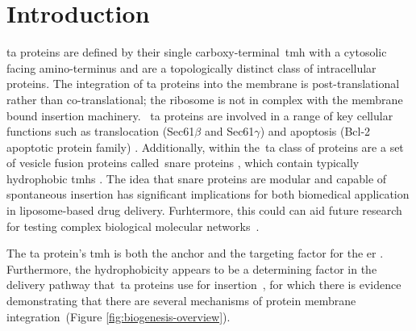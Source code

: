 \section{Introduction}

\gls{ta} proteins are defined by their single carboxy-terminal~\gls{tmh} with a cytosolic facing amino-terminus and are a topologically distinct class of intracellular proteins.
The integration of \gls{ta} proteins into the membrane is post\--translational rather than co-translational; the ribosome is not in complex with the membrane bound insertion machinery.
~\gls{ta} proteins are involved in a range of key cellular functions such as translocation \cite{Osborne2005} (Sec61$\beta$ and Sec61$\gamma$) and apoptosis (Bcl-2 apoptotic protein family) \cite{Hockenbery1990}.
Additionally, within the~\gls{ta} class of proteins are a set of vesicle fusion proteins called~\gls{snare} proteins \cite{Ungar2003}, which contain typically hydrophobic \gls{tmh}s \cite{Kalbfleisch2007}.
The idea that \gls{snare} proteins are modular and capable of spontaneous insertion has significant implications for both biomedical application in liposome\--based drug delivery.
Furhtermore, this could can aid future research for testing complex biological molecular networks~\cite{Allen2013, Nordlund2014}.

The \gls{ta} protein's \gls{tmh} is both the anchor and the targeting factor for the \gls{er} \cite{Kutay1993}.
Furthermore, the hydrophobicity appears to be a determining factor in the delivery pathway that~\gls{ta} proteins use for insertion~\cite{Rabu2008, Rabu2009}, for which there is evidence demonstrating that there are several mechanisms of protein membrane integration~\cite{Rabu2009, Johnson2013}(Figure \ref{fig:biogenesis-overview}).

